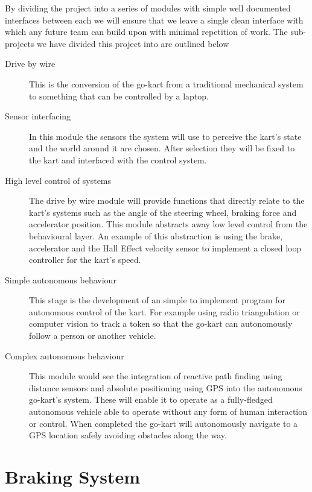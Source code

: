 By dividing the project into a series of modules with simple well documented interfaces between each we will ensure that we leave a single clean interface with which any future team can build upon with minimal repetition of work. The sub-projects we have divided this project into are outlined below
\begin{description}
\item[Drive by wire] This is the conversion of the go-kart from a traditional mechanical system to something that can be controlled by a laptop. 

\item[Sensor interfacing] In this module the sensors the system will use to perceive the kart's state and the world around it are chosen. After selection they will be fixed to the kart and interfaced with the control system. 

\item[High level control of systems] The drive by wire module will provide functions that directly relate to the kart's systems such as the angle of the steering wheel, braking force and accelerator position. This module abstracts away low level control from the behavioural layer. An example of this abstraction is using the brake, accelerator and the Hall Effect velocity sensor to implement a closed loop controller for the kart's speed.  

\item[Simple autonomous behaviour] This stage is the development of an simple to implement program for autonomous control of the kart. For example using radio triangulation or computer vision to track a token so that the go-kart can autonomously follow a person or another vehicle.

\item[Complex autonomous behaviour] This module would see the integration of reactive path finding using distance sensors and absolute positioning using GPS into the autonomous go-kart's system. These will enable it to operate as a fully-fledged autonomous vehicle able to operate without any form of human interaction or control. When completed the go-kart will autonomously navigate to a GPS location safely avoiding obstacles along the way.
\end{description}

\section{Braking System}

